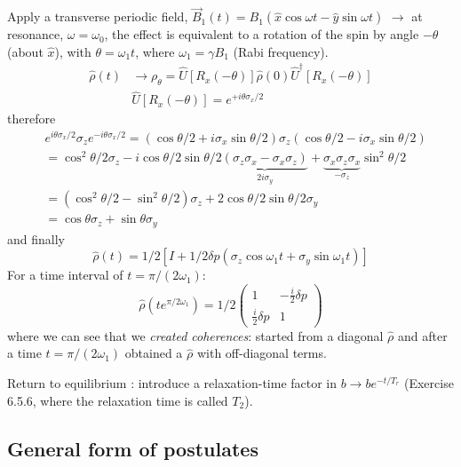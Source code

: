 \documentclass[12pt]{article}
\newcommand{\be}{\begin{equation}}
\newcommand{\ee}{\end{equation}}
\begin{document}
Apply a transverse periodic field, \(\vec{B}_{1}(t)=B_{1}\left(\hat{x} \cos \omega t-\hat{y} \sin \omega t\right)\)
\(\rightarrow\) at resonance, \(\omega=\omega_{0}\), the effect is equivalent to a
rotation of the spin by angle \(-\theta\) (about $\hat{x}$), with \(\theta=\omega_{1} t\), where \(\omega_{1}=\gamma B_{1}\) (Rabi frequency).
\be
\begin{aligned} 
\hat{\rho}(t) & \rightarrow \rho_{\theta}=
\hat{U}\left[R_{x}(-\theta)\right] \hat{\rho}(0) \hat{U}^{\dagger}\left[R_{x}(-\theta)\right] \\ 
& \hat{U}\left[R_{x}(-\theta)\right]=e^{+i \theta \sigma_{x} / 2} 
\end{aligned}
\ee
therefore
\be
\begin{aligned}
&e^{i \theta \sigma_{x} / 2} \sigma_{z} e^{-i \theta \sigma_{x} / 2}
=\left(\cos \theta / 2+i \sigma_{x} \sin \theta / 2\right) \sigma_{z}
 \left(\cos \theta / 2-i \sigma_{x} \sin \theta / 2\right)\\
&=\cos ^{2} \theta / 2 \sigma_{z}-
i \cos \theta / 2 \sin \theta / 2
\underbrace{\left(\sigma_{z} \sigma_{x} -\sigma_{x} \sigma_{z}\right)}%
_{2i\sigma_y}+
\underbrace{\sigma_{x} \sigma_{z} \sigma_{x}}%
_{-\sigma_z}
\sin ^{2} \theta / 2 \\
&=\left(\cos ^{2} \theta / 2-\sin ^{2} \theta / 2\right) \sigma_{z}+2 \cos \theta / 2 \sin \theta / 2 \sigma_{y}\\
&=\cos \theta \sigma_{z}+\sin \theta \sigma_{y}
\end{aligned}
\ee
and finally
\be
\hat{\rho}(t)=1 / 2\left[I+1 / 2 \delta p\left(\sigma_{z} \cos \omega_{1} t+\sigma_{y} \sin \omega_{1} t\right)\right]
\ee
For a time interval of $t = \pi/(2\omega_1)$:
\be
\hat{\rho}\left(t e^{\pi / 2 \omega_{1}}\right)=
1 / 2\begin{pmatrix}1 & -\frac{i}{2} \delta p \\ \frac{i}{2} \delta p & 1\end{pmatrix}
\ee
where we can see that we \emph{created coherences}: started from a
diagonal $\hat{\rho}$ and after a time $t = \pi/(2\omega_1)$
obtained a $\hat{\rho}$ with off-diagonal
terms.

Return to equilibrium : introduce a relaxation-time
factor in $b \rightarrow b e^{-t / T_{r}}$ (Exercise 6.5.6, where the relaxation time is called $T_2$).

\subsection{General form of postulates}
\end{document}
